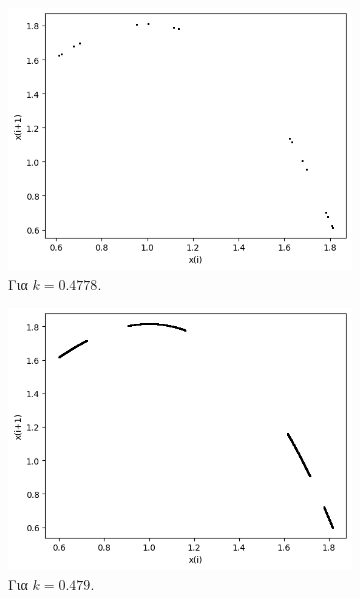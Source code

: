 \begin{figure}[h!]
\begin{subfigure}[b]{0.4\textwidth}
		\includegraphics[width=\textwidth]{LateX images/graphs/k04778}
		\caption{Για $k=0.4778$.}
		\label{f:k5}
	\end{subfigure}
	\hfill
	\begin{subfigure}[b]{0.4\textwidth}
		\centering
		\includegraphics[width=\textwidth]{LateX images/graphs/k0479}
		\caption{Για $k=0.479$.}
		\label{f:k6}
	\end{subfigure}
	\hfill	
	\begin{subfigure}[b]{0.4\textwidth}
		\centering

\end{subfigure}
\end{figure}
